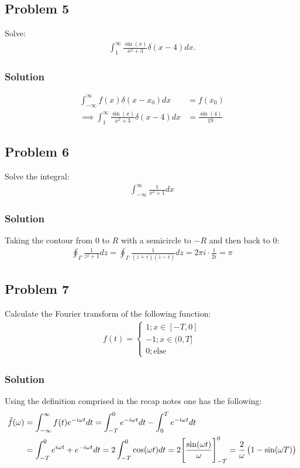 \subsection*{Problem 5}
Solve:
\begin{align*}
    \int_{1}^{\infty}\frac{\sin(x)}{x^2 + 3}\delta(x - 4)dx.
\end{align*}

\subsubsection*{Solution}
\begin{align*}
    \int_{-\infty}^{\infty}f(x)\delta(x - x_0)dx &= f(x_0)\\
    \implies \int_{1}^{\infty}\frac{\sin(x)}{x^2 + 3}\delta(x - 4)dx &= \frac{\sin(4)}{19}
\end{align*}

\subsection*{Problem 6}
Solve the integral:
\begin{align*}
    \int_{-\infty}^\infty \frac{1}{x^2 + 1}dx
\end{align*}

\subsubsection*{Solution}
Taking the contour from $0$ to $R$ with a semicircle to $-R$ and then back to $0$:
\begin{align*}
    \oint_\Gamma \frac{1}{z^2 + 1}dz = \oint_\Gamma\frac{1}{(z + i)(z-i)}dz = 2\pi i\cdot\frac{1}{2i} = \pi
\end{align*}

\subsection*{Problem 7}
Calculate the Fourier transform of the following function:
\begin{align*}
    f(t) =\begin{cases}
        1; x\in[-T, 0]\\
        -1; x\in(0,T]\\
        0; \text{else}
    \end{cases}
\end{align*}

\subsubsection*{Solution}
Using the definition comprised in the recap notes one has the following:
\begin{align*}
    \tilde{f}(\omega) &= \int_{-\infty}^\infty f(t)e^{-i\omega t}dt = \int_{-T}^0 e^{-i\omega t}dt - \int_0^Te^{-i\omega t}dt\\
    &=\int_{-T}^0 e^{i\omega t} + e^{-i\omega t}dt =2\int_{-T}^0\cos(\omega t)dt = 2\Bigg[\frac{\sin(\omega t)}{\omega}\Bigg]_{-T}^{0}=\frac{2}{\omega}\left(1 - \sin(\omega T)\right)
\end{align*}

